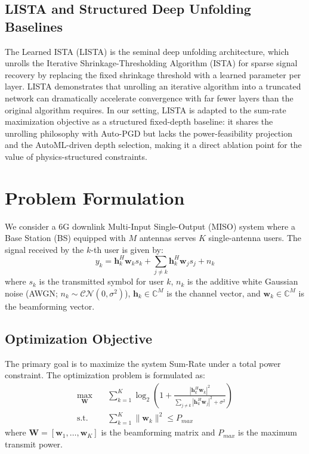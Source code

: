 \documentclass[conference,11pt]{IEEEtran}
\begin{document}
\subsection{LISTA and Structured Deep Unfolding Baselines}
The Learned ISTA (LISTA) \cite{gregor2010lista} is the seminal deep unfolding architecture, which unrolls the Iterative Shrinkage-Thresholding Algorithm (ISTA) for sparse signal recovery by replacing the fixed shrinkage threshold with a learned parameter per layer. LISTA demonstrates that unrolling an iterative algorithm into a truncated network can dramatically accelerate convergence with far fewer layers than the original algorithm requires. In our setting, LISTA is adapted to the sum-rate maximization objective as a structured fixed-depth baseline: it shares the unrolling philosophy with Auto-PGD but lacks the power-feasibility projection and the AutoML-driven depth selection, making it a direct ablation point for the value of physics-structured constraints.

\section{Problem Formulation}

We consider a 6G downlink Multi-Input Single-Output (MISO) system where a Base Station (BS) equipped with $M$ antennas serves $K$ single-antenna users. The signal received by the $k$-th user is given by:
\begin{equation}
y_k = \mathbf{h}_k^H \mathbf{w}_k s_k + \sum_{j \neq k} \mathbf{h}_k^H \mathbf{w}_j s_j + n_k
\end{equation}
where $s_k$ is the transmitted symbol for user $k$, $n_k$ is the additive white Gaussian noise (AWGN; $n_k \sim \mathcal{CN}(0, \sigma^2)$), $\mathbf{h}_k \in \mathbb{C}^{M}$ is the channel vector, and $\mathbf{w}_k \in \mathbb{C}^{M}$ is the beamforming vector.

\subsection{Optimization Objective}
The primary goal is to maximize the system Sum-Rate under a total power constraint. The optimization problem is formulated as:
\begin{align}
\max_{\mathbf{W}} \quad & \sum_{k=1}^K \log_2 \left( 1 + \frac{|\mathbf{h}_k^H \mathbf{w}_k|^2}{\sum_{j \neq k} |\mathbf{h}_k^H \mathbf{w}_j|^2 + \sigma^2} \right) \\
\text{s.t.} \quad & \sum_{k=1}^K \|\mathbf{w}_k\|^2 \leq P_{max}
\end{align}
where $\mathbf{W} = [\mathbf{w}_1, \dots, \mathbf{w}_K]$ is the beamforming matrix and $P_{max}$ is the maximum transmit power.
\end{document}
